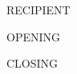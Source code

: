 \documentclass[parskip=half]{scrlttr2}
\begin{document}
\begin{letter}{RECIPIENT}
  \opening{OPENING}
  \closing{CLOSING}
\end{letter}
\end{document}
